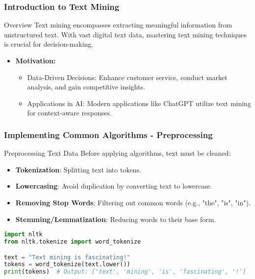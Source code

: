 \documentclass[aspectratio=169]{beamer}
\begin{document}
\begin{frame}
    \titlepage
\end{frame}

\begin{frame}
    \frametitle{Introduction to Text Mining}
    \begin{block}{Overview}
        Text mining encompasses extracting meaningful information from unstructured text. With vast digital text data, mastering text mining techniques is crucial for decision-making.
    \end{block}
    
    \begin{itemize}
        \item \textbf{Motivation:}
        \begin{itemize}
            \item Data-Driven Decisions: Enhance customer service, conduct market analysis, and gain competitive insights.
            \item Applications in AI: Modern applications like ChatGPT utilize text mining for context-aware responses.
        \end{itemize}
    \end{itemize}
\end{frame}

\begin{frame}[fragile]
    \frametitle{Implementing Common Algorithms - Preprocessing}
    \begin{block}{Preprocessing Text Data}
        Before applying algorithms, text must be cleaned:
        \begin{itemize}
            \item \textbf{Tokenization}: Splitting text into tokens.
            \item \textbf{Lowercasing}: Avoid duplication by converting text to lowercase.
            \item \textbf{Removing Stop Words}: Filtering out common words (e.g., "the", "is", "in").
            \item \textbf{Stemming/Lemmatization}: Reducing words to their base form.
        \end{itemize}
    \end{block}

    \begin{lstlisting}[language=Python]
import nltk
from nltk.tokenize import word_tokenize

text = "Text mining is fascinating!"
tokens = word_tokenize(text.lower())
print(tokens)  # Output: ['text', 'mining', 'is', 'fascinating', '!']
    \end{lstlisting}
\end{frame}
\end{document}
